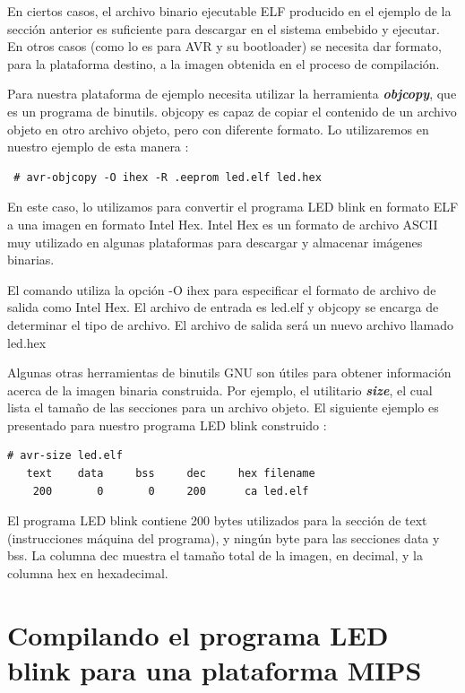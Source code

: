 \documentclass[output=paper, 
colorlinks,
citecolor=brown,
newtxmath
]{langscibook}
\begin{document}
En ciertos casos, el archivo binario ejecutable ELF producido en el 
ejemplo de la sección anterior es suficiente para descargar en el sistema 
embebido y ejecutar. En otros casos (como lo es para AVR
y su bootloader) se necesita dar formato, para la plataforma destino,
 a la imagen obtenida
en el proceso de compilación. 

Para nuestra plataforma de ejemplo necesita utilizar la herramienta
\textit{\textbf{objcopy}}, que es un programa de binutils.
objcopy es capaz de copiar el contenido de un archivo objeto en otro 
archivo objeto, pero con diferente formato.
Lo utilizaremos en nuestro ejemplo de esta manera :

\begin{verbatim}
 # avr-objcopy -O ihex -R .eeprom led.elf led.hex
\end{verbatim}

En este caso, lo utilizamos para convertir el programa LED blink
en formato ELF a una imagen en formato Intel Hex. Intel Hex 
es un formato de archivo ASCII muy utilizado en algunas plataformas
para descargar y almacenar imágenes binarias.

El comando utiliza la opción -O ihex para especificar el formato 
de archivo de salida como Intel Hex. El archivo de entrada es led.elf
y objcopy se encarga de determinar el tipo de archivo. El archivo de salida
será un nuevo archivo llamado led.hex

Algunas otras herramientas de binutils GNU son útiles para obtener 
información acerca de la imagen binaria construida.
Por ejemplo, el utilitario \textit{\textbf{size}}, el cual lista el tamaño de las secciones
para un archivo objeto. El siguiente ejemplo es presentado
para nuestro programa LED blink construido :

\begin{verbatim}
# avr-size led.elf
   text	   data	    bss	    dec	    hex	filename
    200	      0	      0	    200	     ca	led.elf
\end{verbatim}

El programa LED blink contiene 200 bytes utilizados para la sección de text 
(instrucciones máquina del programa), y
ningún byte para las secciones data y bss. La columna dec muestra el tamaño
total de la imagen, en decimal, y la columna hex en hexadecimal.


\section {Compilando el programa LED blink para una plataforma MIPS}
\end{document}
